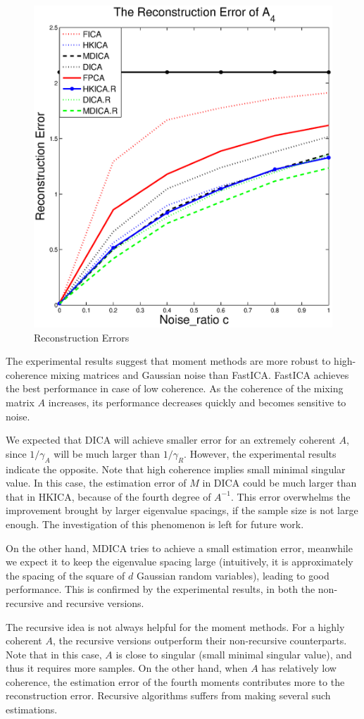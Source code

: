 \documentclass[twoside,11pt]{article}
\begin{document}
\begin{figure}[t]
	\includegraphics[width =0.45\columnwidth]{error4}
\vspace{-0.5cm}
\caption{
\label{fig:Error}
 Reconstruction Errors}
\end{figure}
The experimental results suggest that moment methods are more robust
to high-coherence mixing matrices and Gaussian noise than FastICA.
FastICA achieves the best performance in case of low coherence.
As the coherence of the mixing matrix $A$ increases, its performance decreases quickly and becomes sensitive to noise. 

We expected that DICA will achieve smaller error for an extremely coherent $A$, since $1/\gamma_A$ will be much larger than $1/\gamma_R$. 
However, the experimental results indicate the opposite. 
Note that high coherence implies small minimal singular value.
In this case, the estimation error of $M$ in DICA could be much larger than that in HKICA, because of the fourth degree of $A^{-1}$.
This error overwhelms the improvement brought by larger eigenvalue
spacings, if the sample size is not large enough.
The investigation of this phenomenon is left for future work.

On the other hand, MDICA tries to achieve a small estimation error, meanwhile we expect it to keep the eigenvalue spacing large
(intuitively, it is approximately the spacing of the square of $d$ Gaussian random variables), leading to good performance.
This is confirmed by the experimental results, in both the non-recursive and recursive versions.

The recursive idea is not always helpful for the moment methods. For a highly coherent $A$, the recursive versions outperform their non-recursive counterparts.
Note that in this case, $A$ is close to singular (small minimal
singular value), and thus it requires more samples.
On the other hand, when $A$ has relatively low coherence,  the estimation error of the fourth moments contributes more to the reconstruction error. 
Recursive algorithms suffers from making several such estimations.
\end{document}
